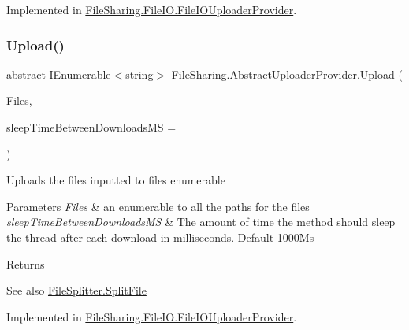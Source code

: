 Implemented in \hyperlink{class_file_sharing_1_1_file_i_o_1_1_file_i_o_uploader_provider_adf0c3382f1c092923de4b2ee6a039923}{File\+Sharing.\+File\+I\+O.\+File\+I\+O\+Uploader\+Provider}.

\mbox{\label{class_file_sharing_1_1_abstract_uploader_provider_a7f85a810557b4bd71443eb2008547647}} 
\subsubsection{\texorpdfstring{Upload()}{Upload()}\hspace{0.1cm}{\footnotesize\ttfamily [2/2]}}
{\footnotesize\ttfamily abstract I\+Enumerable$<$string$>$ File\+Sharing.\+Abstract\+Uploader\+Provider.\+Upload (\begin{DoxyParamCaption}\item[{I\+Enumerable$<$ string $>$}]{Files,  }\item[{int}]{sleep\+Time\+Between\+Downloads\+MS = {} }\end{DoxyParamCaption})\hspace{0.3cm}{\ttfamily [pure virtual]}}



Uploads the files inputted to files enumerable 


\begin{DoxyParams}{Parameters}
{\em Files} & an enumerable to all the paths for the files\\
\hline
{\em sleep\+Time\+Between\+Downloads\+MS} & The amount of time the method should sleep the thread after each download in milliseconds. Default 1000\+Ms\\
\hline
\end{DoxyParams}
\begin{DoxyReturn}{Returns}

\end{DoxyReturn}
\begin{DoxySeeAlso}{See also}
\hyperlink{class_file_sharing_1_1_file_splitter_a25696a2fad3740fa24f79fd194da6ec3}{File\+Splitter.\+Split\+File}


\end{DoxySeeAlso}


Implemented in \hyperlink{class_file_sharing_1_1_file_i_o_1_1_file_i_o_uploader_provider_ab60ebd0e31c88f5d365249d59f81e9fd}{File\+Sharing.\+File\+I\+O.\+File\+I\+O\+Uploader\+Provider}.



